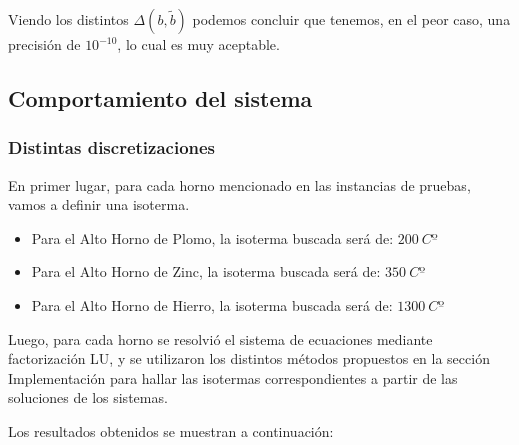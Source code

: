 Viendo los distintos $\Delta(b, \tilde{b})$ podemos concluir que tenemos, en el peor caso, una precisión de $10^{-10}$, lo cual es muy aceptable.

\subsection{Comportamiento del sistema}

\subsubsection{Distintas discretizaciones}

En primer lugar, para cada horno mencionado en las instancias de pruebas, vamos a definir una isoterma.
\begin{itemize}
    \item Para el Alto Horno de Plomo, la isoterma buscada será de: $200\ Cº$
    \item Para el Alto Horno de Zinc, la isoterma buscada será de: $350\ Cº$
    \item Para el Alto Horno de Hierro, la isoterma buscada será de: $1300\ Cº$
\end{itemize}

Luego, para cada horno se resolvió el sistema de ecuaciones mediante factorización LU, y se utilizaron los distintos métodos propuestos en la sección Implementación para hallar las isotermas correspondientes a partir de las soluciones de los sistemas.

Los resultados obtenidos se muestran a continuación:


